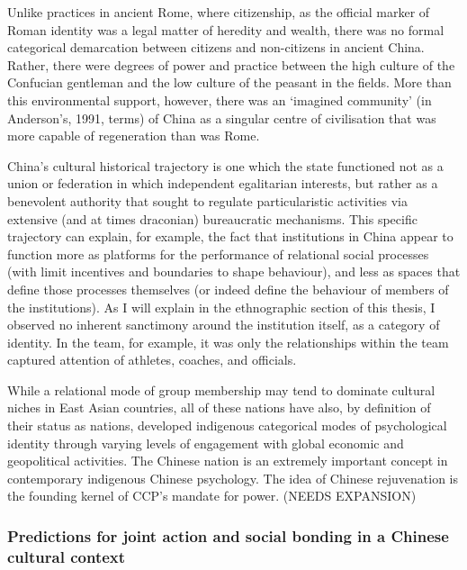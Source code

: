 \begin{CJK}{UTF8}{gbsn}
Unlike practices in ancient Rome, where citizenship, as the official marker of Roman identity was a legal matter of heredity and wealth, there was no formal categorical demarcation between citizens and non-citizens in ancient China.  Rather, there were degrees of power and practice between the high culture of the Confucian gentleman and the low culture of the peasant in the fields.  More than this environmental support, however, there was an ‘imagined community’ (in Anderson’s, 1991, terms) of China as a singular centre of civilisation that was more capable of regeneration than was Rome.

China's cultural historical trajectory is one which the state functioned not as a union or federation in which independent  egalitarian interests, but rather as a benevolent authority that sought to regulate particularistic activities via extensive (and at times draconian) bureaucratic mechanisms.  This specific trajectory can explain, for example, the fact that institutions in China appear to function more as platforms for the performance of relational social processes (with limit incentives and boundaries to shape behaviour), and less as spaces that define those processes themselves (or indeed define the behaviour of members of the institutions).  As I will explain in the ethnographic section of this thesis, I observed no inherent sanctimony around the institution itself, as a category of identity. In the team, for example, it was only the relationships within the team captured attention of athletes, coaches, and officials.

While a relational mode of group membership may tend to dominate cultural niches in East Asian countries, all of these nations have also, by definition of their status as nations, developed indigenous categorical modes of psychological identity through varying levels of engagement with global economic and geopolitical activities.  The Chinese nation is an extremely important concept in contemporary indigenous Chinese psychology.  The idea of Chinese rejuvenation is the founding kernel of CCP's mandate for power.  (NEEDS EXPANSION)



\subsubsection{Predictions for joint action and social bonding in a Chinese cultural context}



\end{CJK}
